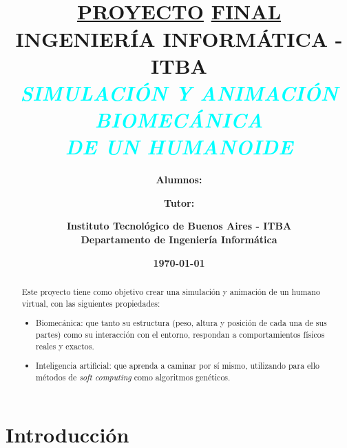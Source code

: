 \documentclass{article}
\title{\textbf{\Large{\\ \underline{PROYECTO} \underline{FINAL} \\ \vspace*{2ex} INGENIER\'IA INFORM\'ATICA - ITBA \\}} \vspace*{4ex} 
\textbf{\textcolor{cyan}{\textit{SIMULACI\'ON Y ANIMACI\'ON BIOMEC\'ANICA \\DE UN HUMANOIDE}  }  \vspace*{3ex}} } %
\author{\textbf{Alumnos:} }
\affil{\textbf{Enzo Altamiranda Graterol}\\%
\url{ealtamir@itba.edu.ar}}
\affil{\textbf{Teresa Fontanella De Santis}\\
\url{tfontane@itba.edu.ar}}
\affil{\textbf{Tom\'as Mehdi}\\
\url{tmehdi@itba.edu.ar}\vspace*{3ex}}
\author{\textbf{Tutor:}}
\affil{ \textbf{Dr. Daniel Ricardo Parisi} \vspace*{8ex}}
\date{\textbf{\small{\today}}} %
\author{  \small{\textbf{Instituto Tecnol\'ogico de Buenos Aires - ITBA \\  Departamento de Ingenier\'ia Inform\'atica} }  }
\affil{\vspace*{0ex}}
\begin{document}

\maketitle %
\thispagestyle{empty} %

\newpage
\tableofcontents
\newpage

 \begin{abstract}
 
\noindent

\begin{adjustwidth}{1.05cm}{0cm}
Este proyecto tiene como objetivo crear una simulaci\'on y animaci\'on de un humano virtual, con las siguientes propiedades:
\begin{itemize}[leftmargin=5.5mm]
\item Biomec\'anica: que tanto su estructura (peso, altura y posici\'on de cada una de sus partes) como su interacci\'on con el entorno, respondan a comportamientos f\'isicos reales y exactos.
\item Inteligencia artificial: que aprenda a caminar por s\'i mismo, utilizando para ello m\'etodos de \textit{soft computing} como algoritmos gen\'eticos.
\end{itemize}

\end{adjustwidth}

 \end{abstract}



\section{Introducci\'on}
\end{document}
